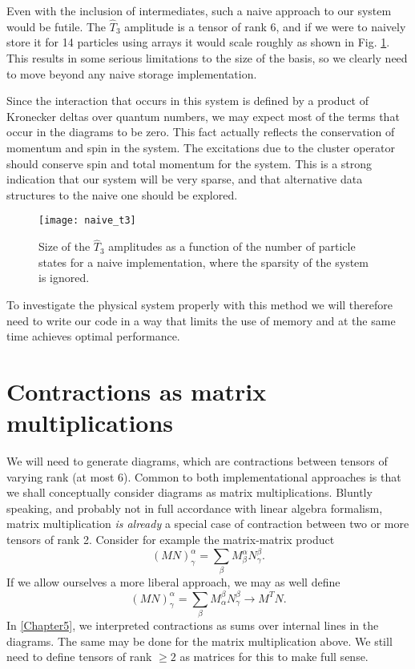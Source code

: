 Even with the inclusion of intermediates, such a naive approach to our system would be futile. The $\hat{T}_3$ amplitude is a tensor of rank 6, and if we were to naively store it for 14 particles using arrays it would scale roughly as shown in Fig. \ref{fig:naive_t3}. This results in some serious limitations to the size of the basis, so we clearly need to move beyond any naive storage implementation.

Since the interaction that occurs in this system is defined by a
product of Kronecker deltas over quantum numbers, we may expect most
of the terms that occur in the diagrams to be zero. This fact actually
reflects the conservation of momentum and spin in the system. The
excitations due to the cluster operator should conserve spin and total
momentum for the system. This is a strong indication that our system
will be very sparse, and that alternative data structures to the naive
one should be explored.

\begin{figure}[hbtp]
    \centering
    \texttt{[image: naive\_t3]}
    \caption{Size of the $\hat{T}_3$ amplitudes as a function of the number of particle states for a naive implementation, where the sparsity of the system is ignored.}
    \label{fig:naive_t3}
\end{figure}

To investigate the physical system properly with this method we will
therefore need to write our code in a way that limits the use of
memory and at the same time achieves optimal performance.


\section{Contractions as matrix multiplications}

We will need to generate diagrams, which are contractions between
tensors of varying rank (at most 6). Common to both implementational
approaches is that we shall conceptually consider diagrams as matrix
multiplications. Bluntly speaking, and probably not in full accordance
with linear algebra formalism, matrix multiplication \emph{is already}
a special case of contraction between two or more tensors of rank
2. Consider for example the matrix-matrix product
\begin{equation}
(MN)^\alpha_\gamma = \sum_\beta M^\alpha_\beta N^\beta_\gamma .
\end{equation}
If we allow ourselves a more liberal approach, we may as well define
\begin{equation}
(MN)^\alpha_\gamma = \sum_\beta M^\beta_\alpha N^\beta_\gamma \rightarrow  M^T N.
\end{equation}
In \ref{Chapter5}, we interpreted contractions as sums over internal
lines in the diagrams. The same may be done for the matrix
multiplication above. We still need to define tensors of rank $\geq 2$
as matrices for this to make full sense.


